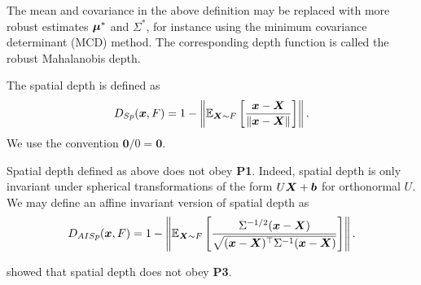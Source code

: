 \begin{remark}
    The mean and covariance in the above definition may be replaced with more
    robust estimates $\bm{\mu}^*$ and $\Sigma^*$, for instance using the minimum
    covariance determinant (MCD) method.
    The corresponding depth function is called the robust Mahalanobis depth.
\end{remark}

\begin{definition}
    The spatial depth is defined as
    \begin{equation}
        D_{Sp}(\bm{x}, F) = 1 - \left\Vert \operatorname{\mathbb{E}}_{\bm{X} \sim F}\left[\frac{\bm{x} - \bm{X}}{\Vert \bm{x} - \bm{X} \Vert}\right] \right\Vert.
    \end{equation}
    We use the convention $\bm0/0 = \bm0$.
\end{definition}

\begin{remark}
    Spatial depth defined as above does not obey \textbf{P1}.
    Indeed, spatial depth is only invariant under spherical transformations of
    the form $U\bm{X} + \bm{b}$ for orthonormal $U$.
    We may define an affine invariant version of spatial depth as
    \begin{equation}
        D_{AISp}(\bm{x}, F) = 1 - \left\Vert \operatorname{\mathbb{E}}_{\bm{X} \sim F}\left[\frac{\Sigma^{-1/2}(\bm{x} - \bm{X})}{\sqrt{(\bm{x} - \bm{X})^\top\Sigma^{-1}(\bm{x} - \bm{X})}}\right] \right\Vert.
    \end{equation}
\end{remark}

\begin{remark}
    \textcite{nagy-2017} showed that spatial depth does not obey \textbf{P3}.
\end{remark}

